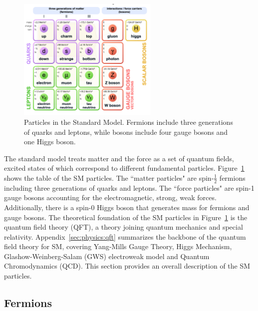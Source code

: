 \begin{figure}[ht]
    \centering
    \includegraphics[width=0.6\textwidth]{chapters/Physics/sectionSMParticles/figures/sm.png}
    \caption{Particles in the Standard Model. Fermions include three generations of quarks and leptons, while bosons include four gauge bosons and one Higgs boson.}
    \label{fig:physics:smParticles:sm}
\end{figure}

The standard model treats matter and the force as a set of quantum fields, excited states of which correspond to different fundamental particles. Figure~\ref{fig:physics:smParticles:sm} shows the table of the SM particles. The ``matter particles" are spin-$\frac{1}{2}$ fermions including three generations of quarks and leptons. The ``force particles" are spin-1 gauge bosons accounting for the electromagnetic, strong, weak forces. Additionally, there is a spin-0 Higgs boson that generates mass for fermions and gauge bosons. The theoretical foundation of the SM particles in Figure~\ref{fig:physics:smParticles:sm} is the quantum field theory (QFT), a theory joining quantum mechanics and special relativity.  Appendix~\ref{sec:physics:qft} summarizes the backbone of the quantum field theory for SM, covering Yang-Mills Gauge Theory, Higgs Mechanism, Glashow-Weinberg-Salam (GWS) electroweak model and Quantum Chromodynamics (QCD). This section provides an overall description of the SM particles. 


\subsection{Fermions}
\label{sec:physics:smParticles:fermions}

